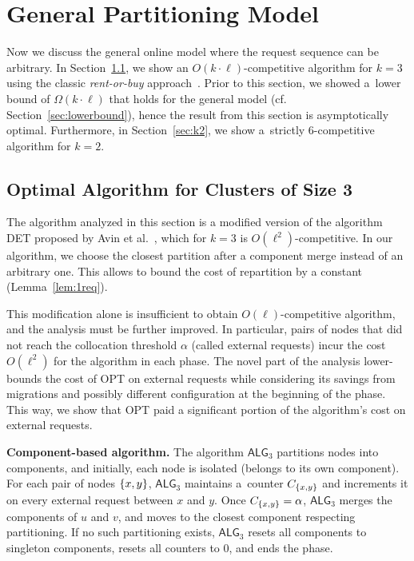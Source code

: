 \documentclass[a4paper,anonymous,USenglish]{lipics-v2019}
\newcommand{\OPT}{\textsc{OPT}\xspace}
\newcommand{\OBRP}{BRP\xspace}
\newcommand{\TAlg}{{\ensuremath{\textsf{ALG}_{3}}}\xspace}
\DeclarePairedDelimiter\set{\{}{\}}
\begin{document}

\section{General Partitioning Model}
\label{sec:part}

Now  we discuss the general online
model where the request sequence
can be arbitrary.
In Section~\ref{sec:k3}, we show an $O(k \cdot \ell)$-competitive algorithm for $k=3$ using the classic \emph{rent-or-buy} approach~\cite{karlin-ski-rental}.
Prior to this section, we showed a~lower bound of $\Omega(k \cdot \ell)$  that holds for the general model (cf. Section~\ref{sec:lowerbound}), hence the result from this section is asymptotically optimal.
Furthermore, in Section~\ref{sec:k2}, we show a~strictly $6$-competitive algorithm for $k=2$.



\subsection{Optimal Algorithm for Clusters of Size 3}
\label{sec:k3}

The algorithm analyzed in this section is a modified version of the algorithm DET proposed by Avin et al.~\cite{repartition-disc}, which for $k=3$ is $O(\ell^2)$-competitive.
In our algorithm, we choose the closest partition after a component merge instead of an arbitrary one.
This allows to bound the cost of repartition by a constant (Lemma~\ref{lem:1req}).

This modification alone is insufficient to obtain $O(\ell)$-competitive algorithm, and the analysis must be further improved.
In particular, pairs of nodes that did not reach the collocation threshold $\alpha$ (called external requests) incur the cost $O(\ell^2)$ for the algorithm in each phase.
The novel part of the analysis lower-bounds the cost of \OPT on external requests while considering its savings from migrations and possibly different configuration at the beginning of the phase.
This way, we show that \OPT paid a significant portion of the algorithm's cost on external requests.

\medskip

\noindent
\textbf{Component-based algorithm.}
The algorithm \TAlg partitions nodes into components, and
initially, each node is isolated (belongs to its own component).
For each pair of nodes $\set{x,y}$, \TAlg maintains a~counter $C_{\set{x,y}}$ and increments it on every external request between $x$ and $y$.
Once $C_{\set{x,y}} = \alpha$, \TAlg merges the components of $u$ and $v$, and moves to the closest component respecting partitioning.
If no such partitioning exists, \TAlg resets all components to singleton components, resets all counters to $0$, and ends the phase.
\end{document}
